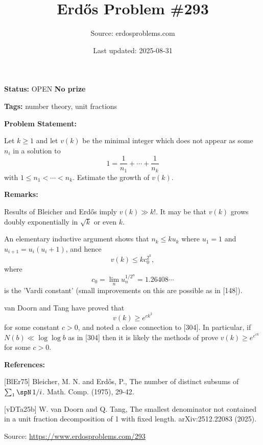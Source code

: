 \documentclass{article}
\title{Erd\H{o}s Problem \#293}
\date{Last updated: 2025-08-31}
\author{Source: erdosproblems.com}
\begin{document}
\maketitle

\noindent\textbf{Status:} OPEN \quad \textbf{No prize}

\noindent\textbf{Tags:} number theory, unit fractions

\medskip
\noindent\textbf{Problem Statement:}

Let $k\geq 1$ and let $v(k)$ be the minimal integer which does not appear as some $n_i$ in a solution to\[1=\frac{1}{n_1}+\cdots+\frac{1}{n_k}\]with $1\leq n_1<\cdots <n_k$. Estimate the growth of $v(k)$.

\bigskip
\noindent\textbf{Remarks:}

Results of Bleicher and Erd\H{o}s \cite{BlEr75} imply $v(k) \gg k!$. It may be that $v(k)$ grows doubly exponentially in $\sqrt{k}$ or even $k$.

An elementary inductive argument shows that $n_k\leq ku_k$ where $u_1=1$ and $u_{i+1}=u_i(u_i+1)$, and hence\[v(k) \leq kc_0^{2^k},\]where\[c_0=\lim_n u_n^{1/2^n}=1.26408\cdots\]is the 'Vardi constant' (small improvements on this are possible as in [148]).

van Doorn and Tang \cite{vDTa25b} have proved that\[v(k)\geq e^{ck^2}\]for some constant $c>0$, and noted a close connection to [304]. In particular, if $N(b)\ll \log\log b$ as in [304] then it is likely the methods of \cite{vDTa25b} prove $v(k) \geq e^{e^{ck}}$ for some $c>0$.

\bigskip
\noindent\textbf{References:}

[BlEr75] Bleicher, M. N. and Erd\H{o}s, P., The number of distinct subsums of $\sum \sb{1}\spN\,1/i$. Math. Comp. (1975), 29-42.
 
 [vDTa25b] W. van Doorn and Q. Tang, The smallest denominator not contained in a unit fraction decomposition of 1 with fixed length. arXiv:2512.22083 (2025).

\bigskip
\noindent\small{Source: \url{https://www.erdosproblems.com/293}}
\end{document}

